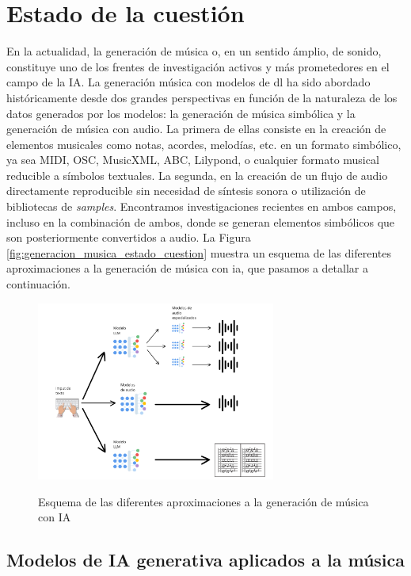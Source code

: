 \chapter{Estado de la cuestión}
\label{chap:estado_cuestion}

En la actualidad, la generación de música o, en un sentido ámplio, de sonido, constituye uno de los frentes de investigación activos y más prometedores en el campo de la IA. La generación música con modelos de \gls{dl} ha sido abordado históricamente desde dos grandes perspectivas en función de la naturaleza de los datos generados por los modelos: la generación de música simbólica y la generación de música con audio. La primera de ellas consiste en la creación de elementos musicales como notas, acordes, melodías, etc. en un formato simbólico, ya sea MIDI, OSC, MusicXML, ABC, Lilypond, o cualquier formato musical reducible a símbolos textuales. La segunda, en la creación de un flujo de audio directamente reproducible sin necesidad de síntesis sonora o utilización de bibliotecas de \textit{samples}. Encontramos investigaciones recientes en ambos campos, incluso en la combinación de ambos, donde se generan elementos simbólicos que son posteriormente convertidos a audio. La Figura \ref{fig:generacion_musica_estado_cuestion} muestra un esquema de las diferentes aproximaciones a la generación de música con \gls{ia}, que pasamos a detallar a continuación.

\begin{figure}[H]
    \caption{Esquema de las diferentes aproximaciones a la generación de música con IA}
    \centering
    \includegraphics[width=0.7\textwidth]{./figuras/generacion_musica_estado_cuestion.png}
    \label{fig:generacion_musica}
\end{figure}

\section{Modelos de IA generativa aplicados a la música}

